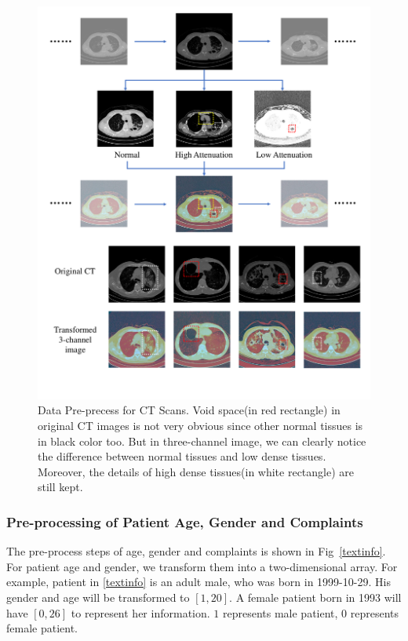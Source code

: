 \begin{figure}[!t]
    \centerline{\includegraphics[width=150mm]{3channel.pdf}}
    \vspace{-1cm}
    \caption{Data Pre-precess for CT Scans. Void space(in red rectangle) in original CT images is not very obvious since other normal tissues is in black color too. But in three-channel image, we can clearly notice the difference between normal tissues and low dense tissues. Moreover, the details of high dense tissues(in white rectangle) are still kept. }
    \vspace{-0cm}
    \label{3channel}
    \end{figure}

\subsubsection{Pre-processing of Patient Age, Gender and Complaints}
\label{textdata}
The pre-process steps of age, gender and complaints is shown in Fig~\ref{textinfo}. 
For patient age and gender, we transform them into a two-dimensional array. For example, patient in \ref{textinfo} is an adult male, who was born in 1999-10-29. His gender and age will be transformed to $[1, 20]$. A female patient born in 1993 will have $[0, 26]$ to represent her information. $1$ represents male patient, $0$ represents female patient.

